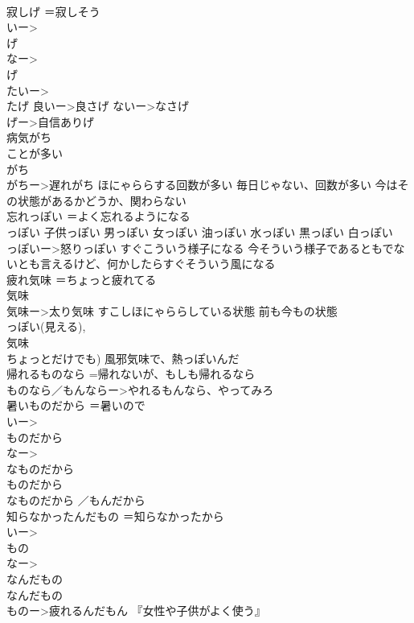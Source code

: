 \documentclass[8pt]{extreport}
\begin{document}
\begin{CJK}{UTF8}{min}
\\	寂しげ	＝寂しそう 
\\	いー>
\\	げ 
\\	なー>
\\	げ 
\\	たいー>
\\	たげ 良いー>良さげ ないー>なさげ 
\\	げー>自信ありげ 
\\	病気がち	
\\	ことが多い 
\\	がち 
\\	がちー>遅れがち ほにゃららする回数が多い 毎日じゃない、回数が多い 今はその状態があるかどうか、関わらない 
\\	忘れっぽい	＝よく忘れるようになる 
\\	っぽい 子供っぽい 男っぽい 女っぽい 油っぽい 水っぽい 黒っぽい 白っぽい 
\\	っぽいー>怒りっぽい すぐこういう様子になる 今そういう様子であるともでないとも言えるけど、何かしたらすぐそういう風になる 
\\	疲れ気味	＝ちょっと疲れてる 
\\	気味 
\\	気味ー>太り気味 すこしほにゃららしている状態 前も今もの状態 
\\	っぽい(見える), 
\\	気味
\\	ちょっとだけでも) 風邪気味で、熱っぽいんだ
\\	帰れるものなら	=帰れないが、もしも帰れるなら 
\\	ものなら／もんならー>やれるもんなら、やってみろ
\\	暑いものだから	＝暑いので 
\\	いー>
\\	ものだから 
\\	なー>
\\	なものだから 
\\	ものだから 
\\	なものだから ／もんだから
\\	知らなかったんだもの	＝知らなかったから 
\\	いー>
\\	もの 
\\	なー>
\\	なんだもの 
\\	なんだもの 
\\	ものー>疲れるんだもん 『女性や子供がよく使う』

\end{CJK}
\end{document}
